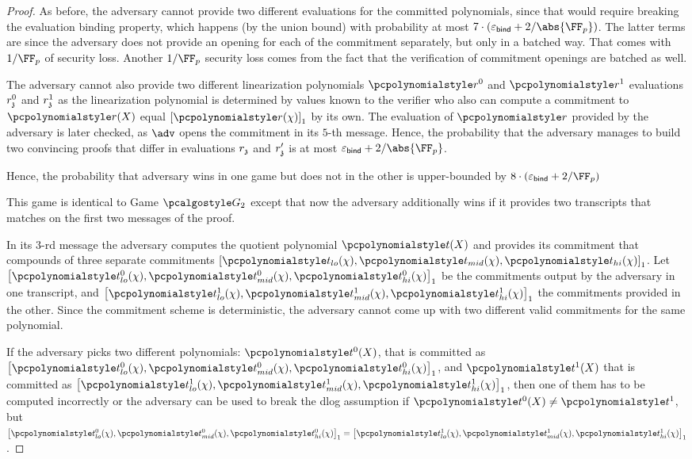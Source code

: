 {\begin{proof}
  As before, the adversary cannot provide two different evaluations for the
  committed polynomials, since that would require breaking the evaluation
  binding property, which happens (by the union bound) with probability at most
  $7 \cdot (\epsbind + \infrac{2}{\abs{\FF_p}})$. The latter terms are since
  the adversary does not provide an opening for each of the commitment
  separately, but only in a batched way. That comes with $\infrac{1}{\FF_p}$ of
  security loss. Another $\infrac{1}{\FF_p}$ security loss comes from the fact
  that the verification of commitment openings are batched as well.

  The adversary cannot also provide two different linearization polynomials
  $\p{r^0}$ and $\p{r^1}$ evaluations $r^0_{\mathfrak{z}}$ and $r^1_{\mathfrak{z}}$ as the
  linearization polynomial is determined by values known to the verifier who
  also can compute a commitment to $\p{r}(X)$ equal $\gone{\p{r}(\chi)}$ by its
  own. The evaluation of $\p{r}$ provided by the adversary is later checked, as
  $\adv$ opens the commitment in its $5$-th message. Hence, the probability that the
  adversary manages to build two convincing proofs that differ in evaluations
  $r_{\mathfrak{z}}$ and $r'_{\mathfrak{z}}$ is at most $\epsbind + \infrac{2}{\abs{\FF_p}}$.

  Hence, the probability that adversary wins in one game but does not in the
  other is upper-bounded by $8 \cdot (\epsbind + \infrac{2}{\FF_p})$

   This game is identical to Game $\game{2}$ except that now the
  adversary additionally wins if it provides two transcripts that matches on the
  first two messages of the proof.

   In its $3$-rd message the adversary computes the
  quotient polynomial $\pt(X)$ and provides its commitment that compounds of
  three separate commitments
  $\gone{\p{t_{lo}}(\chi), \p{t_{mid}}(\chi), \p{t_{hi}}(\chi)}$. Let
  $\gone{\p{t^0_{lo}}(\chi), \p{t^0_{mid}}(\chi), \p{t^0_{hi}}(\chi)}$ be the
  commitments output by the adversary in one transcript, and
  $\gone{\p{t^1_{lo}}(\chi), \p{t^1_{mid}}(\chi), \p{t^1_{hi}}(\chi)}$ the commitments
  provided in the other.
%
  Since the commitment scheme is deterministic, the adversary cannot come up
  with two different valid commitments for the same polynomial.

  If the adversary picks two different polynomials: $\p{t^0}(X)$, that is committed
  as $\gone{\p{t^0_{lo}}(\chi), \p{t^0_{mid}}(\chi), \p{t^0_{hi}}(\chi)}$, and
  $\p{t^1}(X)$ that is committed as
  $\gone{\p{t^1_{lo}}(\chi), \p{t^1_{mid}}(\chi), \p{t^1_{hi}}(\chi)}$, then one of
  them has to be computed incorrectly or the adversary can be used to break the dlog
  assumption if $\p{t^0}(X) \neq \p{t^1}$, but $\gone{\p{t^0_{lo}}(\chi),
    \p{t^0_{mid}}(\chi), \p{t^0_{hi}}(\chi)} = \gone{\p{t^1_{lo}}(\chi),
    \p{t^1_{mid}}(\chi), \p{t^1_{hi}}(\chi)}$.


\end{proof}}
